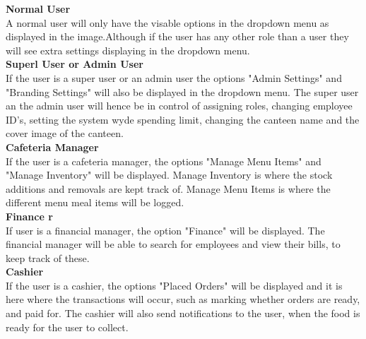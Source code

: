 \documentclass[a4paper,12pt]{article}
\begin{document}
\textbf{Normal User}\\
A normal user will only have the visable options in the dropdown menu as displayed in the image.Although if the user has any other role than a user they will see extra settings displaying in the dropdown menu.\\

\textbf{Superl User or Admin User}\\
If the user is a super user or an admin user the options "Admin Settings" and "Branding Settings" will also be displayed in the dropdown menu. The super user an the admin user will hence be in control of assigning roles, changing employee ID's, setting the system wyde spending limit, changing the canteen name and the cover image of the canteen.  \\

\textbf{Cafeteria Manager}\\
If the user is a cafeteria manager, the options "Manage Menu Items" and "Manage Inventory" will be displayed. Manage Inventory is where the stock additions and removals are kept track of. Manage Menu Items  is where the different menu meal items will be logged.\\


\textbf{Finance r}\\
If user is a financial manager, the option "Finance" will be displayed. The financial manager will be able to search for employees and view their bills, to keep track of these.\\

\textbf{Cashier}\\
If the user is a cashier, the options "Placed Orders" will be displayed and it is here where the transactions will occur, such as marking whether orders are ready, and paid for. The cashier will also send notifications to the user, when the food is ready for the user to collect. 

\end{document}
